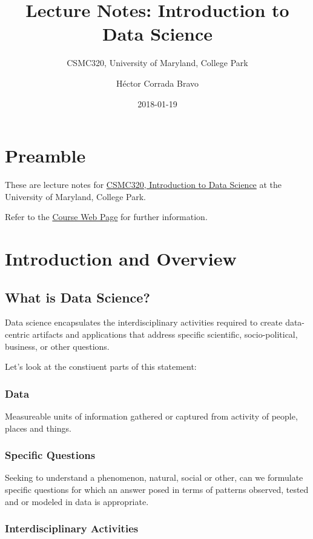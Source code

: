 \documentclass[12pt,]{book}
\title{Lecture Notes: Introduction to Data Science}
\subtitle{CSMC320, University of Maryland, College Park}
\author{Héctor Corrada Bravo}
\date{2018-01-19}
\theoremstyle{definition}
\theoremstyle{definition}
\theoremstyle{definition}
\theoremstyle{remark}
\begin{document}
\maketitle

{
\setcounter{tocdepth}{2}
\tableofcontents
}
\chapter{Preamble}\label{preamble}

These are lecture notes for \href{/}{CSMC320, Introduction to Data
Science} at the University of Maryland, College Park.

Refer to the \href{/}{Course Web Page} for further information.

\chapter{Introduction and Overview}\label{introduction-and-overview}

\section{What is Data Science?}\label{what-is-data-science}

Data science encapsulates the interdisciplinary activities required to
create data-centric artifacts and applications that address specific
scientific, socio-political, business, or other questions.

Let's look at the constiuent parts of this statement:

\subsection{Data}\label{data}

Measureable units of information gathered or captured from activity of
people, places and things.

\subsection{Specific Questions}\label{specific-questions}

Seeking to understand a phenomenon, natural, social or other, can we
formulate specific questions for which an answer posed in terms of
patterns observed, tested and or modeled in data is appropriate.

\subsection{Interdisciplinary
Activities}\label{interdisciplinary-activities}
\end{document}
